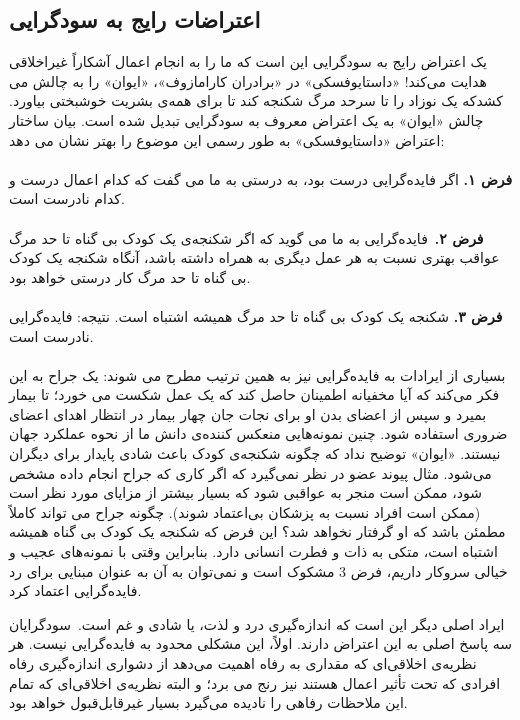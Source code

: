 \subsection*{اعتراضات رایج به سودگرایی}
\label{subsec:اعتراضات رایج به سودگرایی}
یک اعتراض رایج به سودگرایی این است که ما را به انجام اعمال آشکاراً غیراخلاقی هدایت می‌کند!
«داستایوفسکی» در «برادران کارامازوف»، «ایوان» را به چالش می کشدکه یک نوزاد را تا سرحد مرگ شکنجه کند تا برای همه‌ی بشریت خوشبختی بیاورد.
چالش «ایوان» به یک اعتراض معروف به سودگرایی تبدیل شده است.
بیان ساختار اعتراض «داستایوفسکی» به طور رسمی این موضوع را بهتر نشان می دهد:
\\\\
\textbf{فرض ۱.}
اگر فایده‌گرایی درست بود، به درستی به ما می گفت که کدام اعمال درست و کدام نادرست است.
\\\\
\textbf{فرض ۲.}\     فایده‌گرایی به ما می گوید که اگر شکنجه‌ی یک کودک بی گناه تا حد مرگ عواقب بهتری نسبت به هر عمل دیگری به همراه داشته باشد، آنگاه شکنجه یک کودک بی گناه تا حد مرگ کار درستی خواهد بود.
\\\\
\textbf{فرض ۳.}
شکنجه یک کودک بی گناه تا حد مرگ همیشه اشتباه است.
نتیجه: فایده‌گرایی نادرست است.
\\\\
بسیاری از ایرادات به فایده‌گرایی نیز به همین ترتیب مطرح می شوند: یک جراح به این فکر می‌کند که آیا مخفیانه اطمینان حاصل کند که یک عمل شکست می خورد؛ تا بیمار بمیرد و سپس از اعضای بدن او برای نجات جان چهار بیمار در انتظار اهدای اعضای ضروری استفاده شود.
چنین نمونه‌هایی منعکس کننده‌ی دانش ما از نحوه عملکرد جهان نیستند.
«ایوان» توضیح نداد که چگونه شکنجه‌ی کودک باعث شادی پایدار برای دیگران می‌شود.
مثال پیوند عضو در نظر نمی‌گیرد که اگر کاری که جراح انجام داده مشخص شود، ممکن است منجر به عواقبی شود که بسیار بیشتر از مزایای مورد نظر است (ممکن است افراد نسبت به پزشکان بی‌اعتماد شوند).
چگونه جراح می تواند کاملاً مطمئن باشد که او گرفتار نخواهد شد؟ این فرض که شکنجه یک کودک بی گناه همیشه اشتباه است، متکی به ذات و فطرت انسانی دارد.
بنابراین وقتی با نمونه‌های عجیب و خیالی سروکار داریم، فرض 3 مشکوک است و نمی‌توان به آن به عنوان مبنایی برای رد فایده‌گرایی اعتماد کرد.

ایراد اصلی دیگر این است که اندازه‌گیری درد و لذت، یا شادی و غم است.\     سودگرایان سه پاسخ اصلی به این اعتراض دارند.
اولاً، این مشکلی محدود به فایده‌گرایی نیست.
هر نظریه‌ی اخلاقی‌ای که مقداری به رفاه اهمیت می‌دهد از دشواری اندازه‌گیری رفاه افرادی که تحت تأثیر اعمال هستند نیز رنج می برد؛ و البته نظریه‌ی اخلاقی‌ای که تمام این ملاحظات رفاهی را نادیده می‌گیرد بسیار غیرقابل‌قبول خواهد بود.

